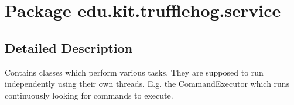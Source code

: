 \hypertarget{namespaceedu_1_1kit_1_1trufflehog_1_1service}{}\section{Package edu.\+kit.\+trufflehog.\+service}
\label{namespaceedu_1_1kit_1_1trufflehog_1_1service}


\subsection{Detailed Description}
Contains classes which perform various tasks. They are supposed to run independently using their own threads. E.\+g. the Command\+Executor which runs continuously looking for commands to execute. 